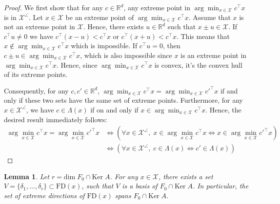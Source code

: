 \documentclass[11pt]{article}
\theoremstyle{plain}
\newtheorem{lemma}{Lemma}
\theoremstyle{definition}
\newcommand{\R}[0]{\mathbb R}
\newcommand{\Ker}[0]{\mathrm{Ker}\;}
\renewcommand{\dim}[0]{\mathrm{dim}\;}
\newcommand{\FD}{\mathrm{FD}}
\newcommand{\cX}{\mathcal{X}}
\begin{document}
        \begin{proof}
    
            We first show that for any $c\in \R^d$, any extreme point in $\arg\min_{x\in \cX}c^\top x$ is in $\cX^\angle$. Let $x\in \cX$ be an extreme point of $\arg\min_{x\in \cX}c^\top x$. Assume that $x$ is not an extreme point in $\cX$. Hence, there exists $u\in \R^d$ such that $x\pm u\in \cX$. If $c^\top u\neq 0$ we have $c^\top (x-u)<c^\top x$ or $c^\top (x+u)<c^\top x$. This means that $x\not\in \arg\min_{x\in \cX}c^\top x$ which is impossible.
            If $c^\top u=0$, then $c\pm u\in \arg\min_{x\in \cX}c^\top x$, which is also impossible since $x$ is an extreme point in $\arg\min_{x\in \cX}c^\top x$. Hence, since $\arg\min_{x\in \cX}c^\top x$ is convex, it's the convex hull of its extreme points.

    
            
            Consequently, for any $c,c'\in \R^d$, $\arg\min_{x\in \cX}c^\top x=\arg\min_{x\in \cX}c'^\top x$ if and only if these two sets have the same set of extreme points. Furthermore, for any $x\in \cX^\angle$, we have $c\in \Lambda(x)$ if on and only if $x\in \arg\min_{x\in \cX}c^\top x$. Hence, the desired result immediately follows:
            \begin{align*}
                \arg\min_{x\in \cX}c^\top x=\arg\min_{x\in \cX}c'^\top x&\Longleftrightarrow \left(\forall x\in \cX^\angle,\; x\in \arg\min_{x\in \cX}c^\top x \Longleftrightarrow x\in \arg\min_{x\in \cX}c'^\top x \right)\\
                & \Longleftrightarrow \left(\forall x \in \cX^\angle,\; c\in \Lambda(x)\Longleftrightarrow c'\in \Lambda(x)\right)
            \end{align*}
        \end{proof}
\begin{lemma} \label{lemma:feasible directions in general polyhedron}
            Let $r=\dim F_0 \cap \Ker A$. For any $x\in \cX$, there exists a set $V=\{\delta_1,\dots,\delta_r\}\subset \FD(x)$, such that $V$ is a basis of $F_0 \cap \Ker A$. In particular, the set of extreme directions of $\FD(x)$ spans $F_0\cap \Ker A$.
        \end{lemma}
\end{document}
